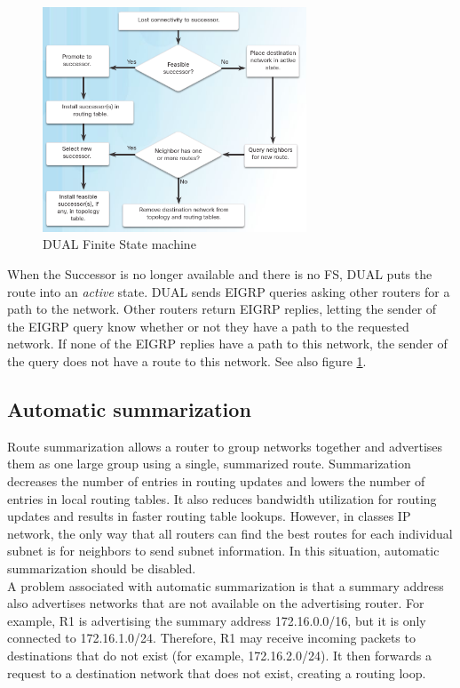 \begin{figure}[hbtp]
\centering
\includegraphics[width=0.7\textwidth]{pictures/EIGRP-DUAL.png}
\caption{DUAL Finite State machine} \label{EIGRP-DUAL}
\end{figure}

When the Successor is no longer available and there is no FS, DUAL puts the route into an \emph{active} state. DUAL sends EIGRP queries asking other routers for a path to the network. Other routers return EIGRP replies, letting the sender of the EIGRP query know whether or not they have a path to the requested network. If none of the EIGRP replies have a path to this network, the sender of the query does not have a route to this network. See also figure \ref{EIGRP-DUAL}.

\subsection{Automatic summarization}

Route summarization allows a router to group networks together and advertises them as one large group using a single, summarized route. Summarization decreases the number of entries in routing updates and lowers the number of entries in local routing tables. It also reduces bandwidth utilization for routing updates and results in faster routing table lookups. However, in classes IP network, the only way that all routers can find the best routes for each individual subnet is for neighbors to send subnet information. In this situation, automatic summarization should be disabled. \\

A problem associated with automatic summarization is that a summary address also advertises networks that are not available on the advertising router. For example, R1 is advertising the summary address 172.16.0.0/16, but it is only connected to 172.16.1.0/24. Therefore, R1 may receive incoming packets to destinations that do not exist (for example, 172.16.2.0/24). It then forwards a request to a destination network that does not exist, creating a routing loop.\\

